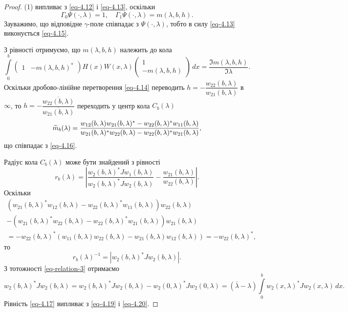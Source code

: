 \begin{proof}
	(1) випливає з \eqref{eq-4.12} і \eqref{eq-4.13}, оскільки
	\begin{equation*}
		\Gamma_0\Psi(\cdot,\lambda) = 1, \quad \Gamma_1\Psi(\cdot,\lambda) = m(\lambda,b,h).
	\end{equation*}
	Зауважимо, що відповідне $\gamma$-поле співпадає з $\Psi(\cdot,\lambda)$, тобто в силу \eqref{eq-4.13} виконується \eqref{eq-4.15}.

	З рівності 
	отримуємо, що $m(\lambda,b,h)$ належить до кола
	\begin{equation}
		\int\limits_0^b 
		\begin{pmatrix}
			1 & -m(\lambda,b,h)^*
		\end{pmatrix}
		H(x) W(x,\lambda)
		\begin{pmatrix}
			1 \\ -m(\lambda,b,h)
		\end{pmatrix}
		\,dx = \frac{\Im{m(\lambda,b,h)}}{\Im{\lambda}}.
	\end{equation}
	Оскільки дробово-лінійне перетворення \eqref{eq-4.14} переводить $h=-\dfrac{w_{22}(b,\lambda)}{w_{21}(b,\lambda)}$ в $\infty$, то $h=-\dfrac{\overline{w_{22}(b,\lambda)}}{\overline{w_{21}(b,\lambda)}}$ переходить у центр кола $C_b(\lambda)$
	\begin{equation*}
		\widetilde{m}_b(\lambda) = \frac{w_{12}(b,\lambda)w_{21}(b,\lambda)^* - w_{22}(b,\lambda)^*w_{11}(b,\lambda)}{w_{21}(b,\lambda)^*w_{22}(b,\lambda) - w_{22}(b,\lambda)^*w_{21}(b,\lambda)},
	\end{equation*}
	що співпадає з \eqref{eq-4.16}.

	Радіус кола $C_b(\lambda)$ може бути знайдений з рівності
	\begin{equation}
		r_b(\lambda) = \left| \frac{w_2(b,\lambda)^*Jw_1(b,\lambda)}{w_2(b,\lambda)^*Jw_2(b,\lambda)} - \frac{w_{21}(b,\lambda)}{w_{22}(b,\lambda)} \right|.
	\end{equation}
	Оскільки
	\begin{multline*}
		\left( w_{21}(b,\lambda)^*w_{12}(b,\lambda) - w_{22}(b,\lambda)^*w_{11}(b,\lambda) \right)w_{22}(b,\lambda) \\
		-\left( w_{21}(b,\lambda)^*w_{22}(b,\lambda) - w_{22}(b,\lambda)^*w_{21}(b,\lambda) \right) w_{21}(b,\lambda) \\
		= -w_{22}(b,\lambda)^* \left( w_{11}(b,\lambda)w_{22}(b,\lambda) - w_{21}(b,\lambda)w_{12}(b,\lambda) \right) = -w_{22}(b,\lambda)^*,
	\end{multline*}
	то
	\begin{equation}\label{eq-4.19}
		r_b(\lambda)^{-1} = \left| w_2(b,\lambda)^*Jw_2(b,\lambda) \right|.
	\end{equation}
	З тотожності \eqref{eq-relation-3} отримаємо
	\begin{equation}\label{eq-4.20}
		w_2(b,\lambda)^*Jw_2(b,\lambda) = w_2(b,\lambda)^*Jw_2(b,\lambda) - w_2(0,\lambda)^*Jw_2(0,\lambda) = (\bar{\lambda} - \lambda)\int\limits_0^b w_2(x,\lambda)^*Jw_2(x,\lambda)\,dx.
	\end{equation}
	Рівність \eqref{eq-4.17} випливає з \eqref{eq-4.19} і \eqref{eq-4.20}.
\end{proof}

